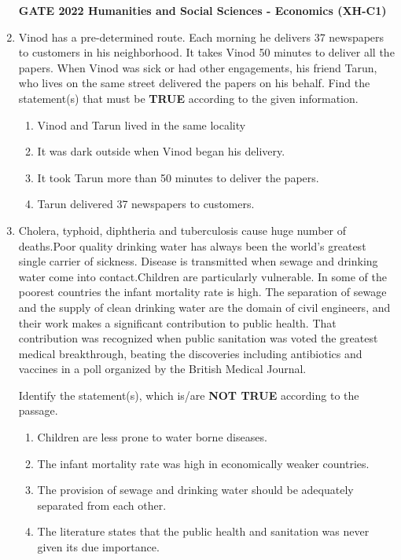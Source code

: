 \documentclass[journal,12pt,onecolumn]{exam}
\theoremstyle{remark}
\begin{document}
\begin{enumerate}
\newpage
\textbf{GATE 2022 Humanities and Social Sciences - Economics (XH-C1)}
\item Vinod has a pre-determined route. Each morning he delivers 37 newspapers to
customers in his neighborhood. It takes Vinod 50 minutes to deliver all the papers.
When Vinod was sick or had other engagements, his friend Tarun, who lives on the
same street delivered the papers on his behalf. 
\vspace{1em}
Find the statement(s) that must be \textbf{TRUE} according to the given information. 
\begin{enumerate}
    \item Vinod and Tarun lived in the same locality   
    \item It was dark outside when Vinod began his delivery. 
    \item It took Tarun more than 50 minutes to deliver the papers. 
    \item Tarun delivered 37 newspapers to customers. 
    
\end{enumerate}

\item Cholera, typhoid, diphtheria and tuberculosis cause huge number of deaths.Poor quality drinking water has always been the world's greatest single carrier of sickness. Disease is transmitted when sewage and drinking water come into contact.Children are particularly vulnerable. In some of the poorest countries the infant mortality rate is high. The separation of sewage and the supply of clean drinking water are the domain of civil engineers, and their work makes a significant contribution to public health. That contribution was recognized when public sanitation was voted the greatest medical breakthrough, beating the discoveries including antibiotics and vaccines in a poll organized by the British Medical Journal.

\vspace{1em}
Identify the statement(s), which is/are \textbf{NOT TRUE} according to the passage.
\begin{enumerate}
    \item Children are less prone to water borne diseases. 
    \item The infant mortality rate was high in economically weaker countries.
    \item The provision of sewage and drinking water should be adequately separated from each other. 
    \item The literature states that the public health and sanitation was never given its due importance. 


\end{enumerate}
\end{enumerate}
\end{document}
